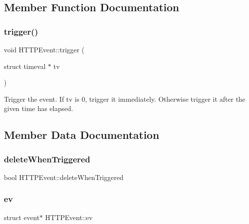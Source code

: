 \subsection{Member Function Documentation}
\mbox{\label{class_h_t_t_p_event_ad3e2ab005035c3ac678b29095ac0da87}} 
\subsubsection{\texorpdfstring{trigger()}{trigger()}}
{\footnotesize\ttfamily void H\+T\+T\+P\+Event\+::trigger (\begin{DoxyParamCaption}\item[{struct timeval $\ast$}]{tv }\end{DoxyParamCaption})}

Trigger the event. If tv is 0, trigger it immediately. Otherwise trigger it after the given time has elapsed. 

\subsection{Member Data Documentation}
\mbox{\label{class_h_t_t_p_event_a226496f0af00e98c301e92cd8bf7ca9b}} 
\subsubsection{\texorpdfstring{delete\+When\+Triggered}{deleteWhenTriggered}}
{\footnotesize\ttfamily bool H\+T\+T\+P\+Event\+::delete\+When\+Triggered}

\mbox{\label{class_h_t_t_p_event_a1b00e03074314686bf8b01979f938a45}} 
\subsubsection{\texorpdfstring{ev}{ev}}
{\footnotesize\ttfamily struct event$\ast$ H\+T\+T\+P\+Event\+::ev\hspace{0.3cm}{\ttfamily [private]}}

